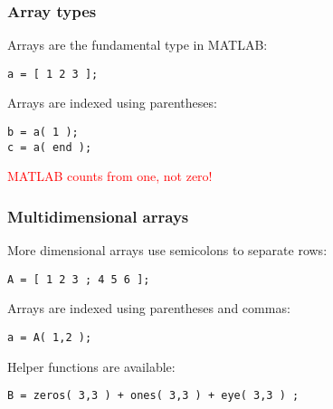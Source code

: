 \documentclass[11pt]{beamer}
\begin{document}
\begin{frame}[fragile]
  \frametitle{Array types}
  \Enlarge

  \begin{enumerate}
  \myitem  Arrays are the fundamental type in MATLAB:
  \end{enumerate}
  \begin{Verbatim}
a = [ 1 2 3 ];
  \end{Verbatim}
  \begin{enumerate}
  \myitem  Arrays are indexed using parentheses:
  \end{enumerate}
  \begin{Verbatim}
b = a( 1 );
c = a( end );
  \end{Verbatim}
  \begin{enumerate}
  \myitem  \textcolor{red}{MATLAB counts from one, not zero!}
  \end{enumerate}
\end{frame}

\begin{frame}[fragile]
  \frametitle{Multidimensional arrays}
  \Enlarge

  \begin{enumerate}
  \myitem  More dimensional arrays use semicolons to separate rows:
  \end{enumerate}
  \begin{Verbatim}
A = [ 1 2 3 ; 4 5 6 ];
  \end{Verbatim}
  \begin{enumerate}
  \myitem  Arrays are indexed using parentheses and commas:
  \end{enumerate}
  \begin{Verbatim}
a = A( 1,2 );
  \end{Verbatim}
  \begin{enumerate}
  \myitem  Helper functions are available:
  \end{enumerate}
  \begin{Verbatim}
B = zeros( 3,3 ) + ones( 3,3 ) + eye( 3,3 ) ;
  \end{Verbatim}
\end{frame}
\end{document}
